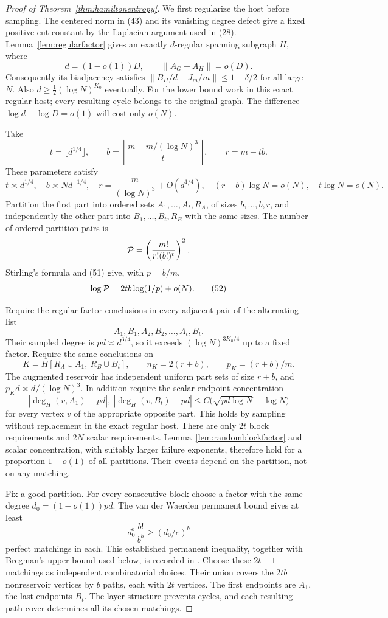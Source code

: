 \begin{proof}[Proof of Theorem~\ref{thm:hamiltonentropy}]
We first regularize the host before sampling.
The centered norm in (43) and its vanishing degree defect
give a fixed positive cut constant by the Laplacian argument
used in (28).
Lemma~\ref{lem:regularfactor} gives an exactly \(d\)-regular
spanning subgraph \(H\), where
\[
 d=(1-o(1))D,\qquad
 \|A_G-A_H\|=o(D).
\]
Consequently its biadjacency satisfies
\(\|B_H/d-J_m/m\|\leq1-\delta/2\) for all large \(N\).
Also \(d\geq\tfrac12(\log N)^{K_0}\) eventually.
For the lower bound work in this exact regular host;
every resulting cycle belongs to the original graph.
The difference \(\log d-\log D=o(1)\) will cost only \(o(N)\).

Take
\[
 t=\lfloor d^{1/4}\rfloor,\qquad
 b=\left\lfloor\frac{m-m/(\log N)^3}{t}\right\rfloor,\qquad
 r=m-tb.
\]
These parameters satisfy
\[
 t\asymp d^{1/4},\quad b\asymp N d^{-1/4},\quad
 r=\frac{m}{(\log N)^3}+O(d^{1/4}),\quad
 (r+b)\log N=o(N),\quad t\log N=o(N).                        \tag{51}
\]
Partition the first part into ordered sets
\(A_1,\ldots,A_t,R_A\), of sizes \(b,\ldots,b,r\),
and independently the other part into
\(B_1,\ldots,B_t,R_B\) with the same sizes.
The number of ordered partition pairs is
\[
 {\cal P}=\left(\frac{m!}{r!(b!)^t}\right)^2.
\]
Stirling's formula and (51) give, with \(p=b/m\),
\[
 \log{\cal P}=2tb\log(1/p)+o(N).                            \tag{52}
\]

Require the regular-factor conclusions in every adjacent
pair of the alternating list
\[
 A_1,B_1,A_2,B_2,\ldots,A_t,B_t.
\]
Their sampled degree is \(pd\asymp d^{3/4}\),
so it exceeds \((\log N)^{3K_0/4}\) up to a fixed factor.
Require the same conclusions on
\[
 K=H[R_A\cup A_1,\ R_B\cup B_t],\qquad
 n_K=2(r+b),\qquad p_K=(r+b)/m .
\]
The augmented reservoir has independent uniform part sets
of size \(r+b\), and \(p_Kd\asymp d/(\log N)^3\).
In addition require the scalar endpoint concentration
\[
 |\deg_H(v,A_1)-pd|,\ |\deg_H(v,B_t)-pd|
       \leq C\bigl(\sqrt{pd\log N}+\log N\bigr)              \tag{53}
\]
for every vertex \(v\) of the appropriate opposite part.
This holds by sampling without replacement in the exact
regular host.
There are only \(2t\) block requirements and \(2N\) scalar
requirements. Lemma~\ref{lem:randomblockfactor} and scalar
concentration, with suitably larger failure exponents,
therefore hold for a proportion \(1-o(1)\) of all partitions.
Their events depend on the partition, not on any matching.

Fix a good partition.
For every consecutive block choose a factor with the same
degree \(d_0=(1-o(1))pd\).
The van der Waerden permanent bound gives at least
\[
 d_0^b\,\frac{b!}{b^b}\geq(d_0/e)^b
\]
perfect matchings in each.
This established permanent inequality, together with
Bregman's upper bound used below, is recorded in
\cite[Section 2.4]{BT}.
Choose these \(2t-1\) matchings as independent combinatorial
choices. Their union covers the \(2tb\) nonreservoir vertices
by \(b\) paths, each with \(2t\) vertices.
The first endpoints are \(A_1\), the last endpoints \(B_t\).
The layer structure prevents cycles, and each resulting path
cover determines all its chosen matchings.


\end{proof}
